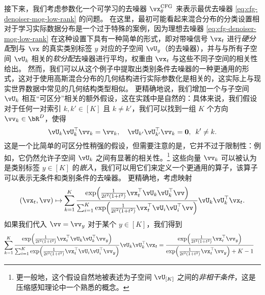 \documentclass[../../book-main_zh.tex]{subfiles}
\begin{document}
\begin{example}
  接下来，我们考虑参数化一个可学习的去噪器 $\vx_{\theta}^{\mathrm{CFG}}$ 来表示最优去噪器 \eqref{eq:cfg-denoiser-mog-low-rank} 的问题。
  在这里，最初可能看起来混合分布的分类设置相对于学习实际数据分布是一个过于特殊的案例，因为理想去噪器 \eqref{eq:cfg-denoiser-mog-low-rank} 在这种设置下具有一种简单的形式，即对带噪信号 $\vx_t$ 进行\textit{硬分配}到与 $\vx$ 的真实类别标签 $y$ 对应的子空间 $\vU_y$（的去噪器），并与与所有子空间 $\vU_k$ 相关的\textit{软分配}去噪器进行平均，权重由 $\vx_t$ 与这些不同子空间的相关性给出。
  然而，我们可以从这个例子中提取出类别条件去噪器的一种更通用的形式，这对于使用高斯混合分布的几何结构进行实际参数化是相关的，这实际上与现实世界数据中常见的几何结构类型相似。
  更精确地说，我们增加一个与子空间 $\vU_k$ 相互“可区分”相关的额外假设，这在实践中是自然的：具体来说，我们假设对于任何一对索引 $k, k' \in [K]$ 且 $k \neq k'$，我们可以找到一组 $K$ 个方向 $\vv_{k} \in \bR^D$，使得
  \begin{equation}
    \vU_{k}\vU_{k}^\top \vv_k = \vv_k, \quad
    \vU_{k'}\vU_{k'}^\top \vv_k = \Zero, \enspace k' \neq k.
  \end{equation}
  这是一个比简单的可区分性稍强的假设，但需要注意的是，它并不过于限制性：例如，它仍然允许子空间 $\vU_{k}$ 之间有显著的相关性。\footnote{ 更一般地，这个假设自然地被表述为子空间 $\vU_{[K]}$ 之间的\textit{非相干条件}，这是压缩感知理论中一个熟悉的概念。}
  这些向量 $\vv_k$ 可以被认为是类别标签 $y \in [K]$ 的\textit{嵌入}，我们可以用它们来定义一个更通用的算子，该算子可以表示无条件和类别条件的去噪器。
  更精确地，考虑映射
  \begin{equation}\label{eq:mog-conditional-denoising-unified-operator}
    (\vx_t, \vv) \mapsto
    \sum_{k = 1}^{K}\frac{
      \exp\rp{\frac{1}{2t^{2}(1
      + t^{2})}\vx_t^\top \vU_k \vU_k^\top \vv}
    }
    {
      \sum_{i
      = 1}^{K}\exp\rp{\frac{1}{2t^{2}(1
      + t^{2})}\vx_t^\top \vU_i \vU_i^\top \vv}
    }
    \vU_{k}\vU_{k}^{\top}\vx_t.
  \end{equation}
  如果我们代入 $\vv = \vv_y$ 对于某个 $y \in [K]$，我们得到
  \begin{align}
    \begin{split}
    \sum_{k = 1}^{K}
    \frac{
      \exp\rp{\frac{1}{2t^{2}(1
      + t^{2})}\vx_t^\top \vU_k \vU_k^\top \vv_y}
    }
    {
      \sum_{i
      = 1}^{K}\exp\rp{\frac{1}{2t^{2}(1
      + t^{2})}\vx_t^\top \vU_i \vU_i^\top \vv_y}
    }
    \vU_{k}\vU_{k}^{\top}\vx_t
    &=
    \frac{
      \exp\rp{\frac{1}{2t^{2}(1
      + t^{2})}\vx_t^\top \vv_y}
    }
    {
      \exp\rp{\frac{1}{2t^{2}(1
      + t^{2})}\vx_t^\top \vv_y}
      + K-1
}
\end{split}
\end{align}
\end{example}
\end{document}
